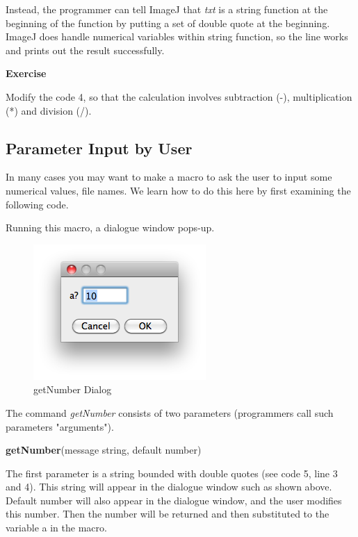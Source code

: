 \documentclass[11pt,a4paper,oneside]{report}
\newenvironment{indentexercise}[1]%
{{\setlength{\leftmargin}{2em}}%
\textbf{Exercise \thesubsection-#1}%
\begin{list}{}%
	\item%
}
{\end{list}}
\newenvironment{indentCom}%
{\begin{list}{}%
         {\setlength{\leftmargin}{1em}}%
         \item[]%
}
{\end{list}}
\begin{document}
Instead, the programmer can tell ImageJ that \textit{txt} is a string function at the beginning of the function by putting a set of double quote at the beginning. ImageJ does handle numerical variables within string function, so the line works and prints out the result successfully.  

\begin{indentexercise}{2}
Modify the code 4, so that the calculation involves subtraction (-), multiplication (*) and division (/). 
\end{indentexercise}

\subsection{Parameter Input by User}
In many cases you may want to make a macro to ask the user to input some numerical values, file names. We learn how to do this here by first examining the following code. 

Running this macro,  a dialogue window pops-up.

\begin{figure}[htbp]
\begin{center}
\includegraphics[scale=0.6]{fig/getNumberDialog.png}
\caption{getNumber Dialog} \label{fig_getNUmber}
\end{center}
\end{figure}

The command \textit{getNumber} consists of two parameters (programmers call such parameters "arguments").
\begin{indentCom}
\textbf{getNumber}(message string, default number)
\end{indentCom}
The first parameter is a string bounded with double quotes (see code 5, line 3 and 4). This string will appear in the dialogue window such as shown above. Default number will also appear in the dialogue window, and the user modifies this number. Then the number will be returned and then substituted to the variable a in the macro. 
\end{document}
